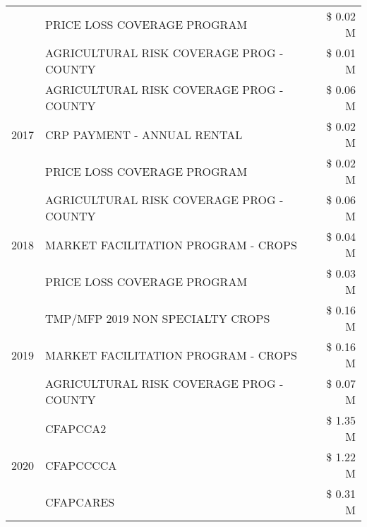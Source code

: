 \begin{tabular}{llr}
 & PRICE LOSS COVERAGE PROGRAM & \$ 0.02 M \\
 & AGRICULTURAL RISK COVERAGE PROG - COUNTY & \$ 0.01 M \\
\cline{1-3}
\multirow[t]{3}{*}{2017} & AGRICULTURAL RISK COVERAGE PROG - COUNTY & \$ 0.06 M \\
 & CRP PAYMENT - ANNUAL RENTAL & \$ 0.02 M \\
 & PRICE LOSS COVERAGE PROGRAM & \$ 0.02 M \\
\cline{1-3}
\multirow[t]{3}{*}{2018} & AGRICULTURAL RISK COVERAGE PROG - COUNTY & \$ 0.06 M \\
 & MARKET FACILITATION PROGRAM - CROPS & \$ 0.04 M \\
 & PRICE LOSS COVERAGE PROGRAM & \$ 0.03 M \\
\cline{1-3}
\multirow[t]{3}{*}{2019} & TMP/MFP 2019 NON SPECIALTY CROPS & \$ 0.16 M \\
 & MARKET FACILITATION PROGRAM - CROPS & \$ 0.16 M \\
 & AGRICULTURAL RISK COVERAGE PROG - COUNTY & \$ 0.07 M \\
\cline{1-3}
\multirow[t]{3}{*}{2020} & CFAPCCA2 & \$ 1.35 M \\
 & CFAPCCCCA & \$ 1.22 M \\
 & CFAPCARES & \$ 0.31 M \\
\cline{1-3}
\bottomrule
\end{tabular}
